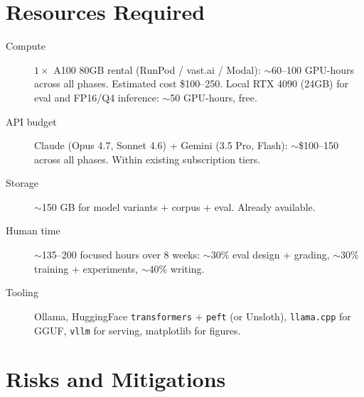 \documentclass[11pt]{article}
\begin{document}
\section{Resources Required}

\begin{description}
  \item[Compute] $1\times$ A100 80GB rental (RunPod / vast.ai / Modal): $\sim$60--100 GPU-hours across all phases. Estimated cost \$100--250. Local RTX 4090 (24GB) for eval and FP16/Q4 inference: $\sim$50 GPU-hours, free.
  \item[API budget] Claude (Opus 4.7, Sonnet 4.6) + Gemini (3.5 Pro, Flash): $\sim$\$100--150 across all phases. Within existing subscription tiers.
  \item[Storage] $\sim$150 GB for model variants + corpus + eval. Already available.
  \item[Human time] $\sim$135--200 focused hours over 8 weeks: $\sim$30\% eval design + grading, $\sim$30\% training + experiments, $\sim$40\% writing.
  \item[Tooling] Ollama, HuggingFace \texttt{transformers} + \texttt{peft} (or Unsloth), \texttt{llama.cpp} for GGUF, \texttt{vllm} for serving, matplotlib for figures.
\end{description}

\section{Risks and Mitigations}
\end{document}
